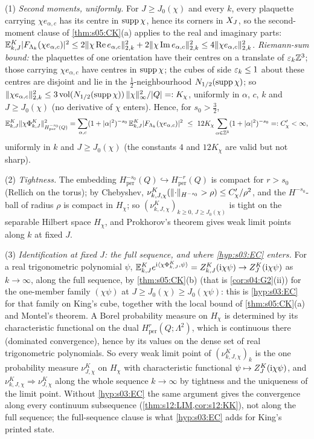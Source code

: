 (1) \emph{Second moments, uniformly.} For $J\ge J_0(\chi)$ and every $k$, every plaquette carrying $\chi e_{\alpha,c}$ has its centre in $\operatorname{supp}\chi$, hence its corners in $X_J$, so the second-moment clause of \cref{thm:s05:CK}(a) applies to the real and imaginary parts: $\mathbb E^K_{k,J}|F_{\Lambda_k}(\chi e_{\alpha,c})|^2\le2\lVert \chi\operatorname{Re} e_{\alpha,c}\rVert^2_{2,k}+2\lVert \chi\operatorname{Im} e_{\alpha,c}\rVert^2_{2,k}\le4\lVert \chi e_{\alpha,c}\rVert^2_{2,k}$. \emph{Riemann-sum bound:} the plaquettes of one orientation have their centres on a translate of $\varepsilon_k\mathbb Z^3$; those carrying $\chi e_{\alpha,c}$ have centres in $\operatorname{supp}\chi$; the cubes of side $\varepsilon_k\le1$ about these centres are disjoint and lie in the $\frac12$-neighbourhood $N_{1/2}(\operatorname{supp}\chi)$; so $\lVert \chi e_{\alpha,c}\rVert^2_{2,k}\le3\,\mathrm{vol}(N_{1/2}(\operatorname{supp}\chi))\,\lVert \chi\rVert_\infty^2/|Q|=:K_\chi$, uniformly in $\alpha$, $c$, $k$ and $J\ge J_0(\chi)$ (no derivative of $\chi$ enters). Hence, for $s_0>\frac32$,
\begin{equation}\label{eq:s09:secondmoment}
\E^K_{k,J}\norm{\chi\Phi^K_{k,J}}^2_{H^{-s_0}_{\mathrm{per}}(Q)}=\sum_{\alpha,c}(1+|\alpha|^2)^{-s_0}\,\E^K_{k,J}|F_{\Lk}(\chi e_{\alpha,c})|^2\ \le\ 12K_\chi\sum_{\alpha\in\Z^3}(1+|\alpha|^2)^{-s_0}=:C'_\chi<\infty,
\end{equation}
uniformly in $k$ and $J\ge J_0(\chi)$ (the constants $4$ and $12K_\chi$ are valid but not sharp).

(2) \emph{Tightness.} The embedding $H^{-s_0}_{\mathrm{per}}(Q)\hookrightarrow H^{-r}_{\mathrm{per}}(Q)$ is compact for $r>s_0$ (Rellich on the torus); by Chebyshev, $\nu^K_{k,J,\chi}(\lVert \cdot\rVert_{H^{-s_0}}>\rho)\le C'_\chi/\rho^2$, and the $H^{-s_0}$-ball of radius $\rho$ is compact in $H_\chi$; so $(\nu^K_{k,J,\chi})_{k\ge0,\,J\ge J_0(\chi)}$ is tight on the separable Hilbert space $H_\chi$, and Prokhorov's theorem \cite{Bil99} gives weak limit points along $k$ at fixed $J$.

(3) \emph{Identification at fixed $J$: the full sequence, and where \cref{hyp:s03:EC} enters.} For a real trigonometric polynomial $\psi$, $\mathbb E^K_{k,J}e^{\mathrm i\langle \chi\Phi^K_{k,J},\psi\rangle}=Z^K_{k,J}(\mathrm i\chi\psi)\to Z^{K}_{J}(\mathrm i\chi\psi)$ as $k\to\infty$, along the full sequence, by \cref{thm:s05:CK}(b) (that is \cref{cor:s04:G2}(ii)) for the one-member family $(\chi\psi)$ at $J\ge J_0(\chi)\ge J_0(\chi\psi)$: this is \cref{hyp:s03:EC} for that family on King's cube, together with the local bound of \cref{thm:s05:CK}(a) and Montel's theorem. A Borel probability measure on $H_\chi$ is determined by its characteristic functional on the dual $H^r_{\mathrm{per}}(Q;\Lambda^2)$, which is continuous there (dominated convergence), hence by its values on the dense set of real trigonometric polynomials. So every weak limit point of $(\nu^K_{k,J,\chi})_k$ is the one probability measure $\nu^K_{J,\chi}$ on $H_\chi$ with characteristic functional $\psi\mapsto Z^{K}_{J}(\mathrm i\chi\psi)$, and $\nu^K_{k,J,\chi}\Rightarrow\nu^K_{J,\chi}$ along the whole sequence $k\to\infty$ by tightness and the uniqueness of the limit point. Without \cref{hyp:s03:EC} the same argument gives the convergence along every continuum subsequence (\cref{thm:s12:LIM,cor:s12:KK}), not along the full sequence; the full-sequence clause is what \cref{hyp:s03:EC} adds for King's printed state.

